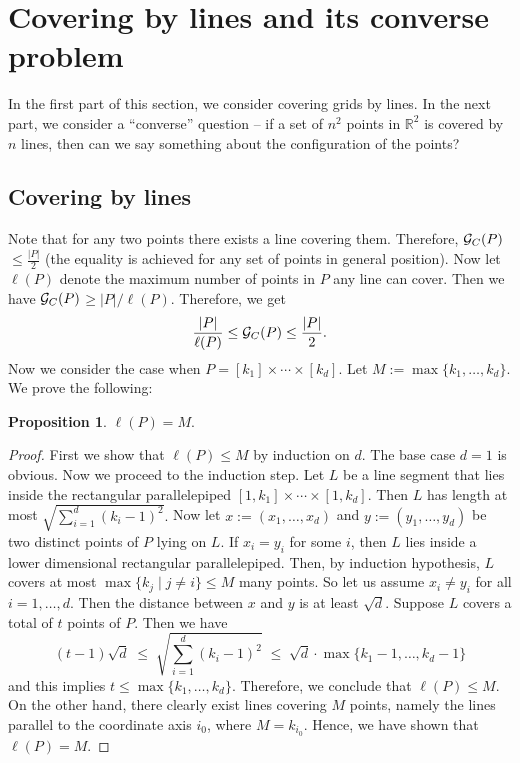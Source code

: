 \documentclass[
final
]{dmtcs-episciences}
\numberwithin{equation}{subsection}
\newtheorem{prop}[defn]{Proposition}%
\newcommand{\remove}[1]{}
\newcommand{\ga}{${\cal G}_C(P)$}
\newcommand{\size}[1]{\left| #1 \right|}
\begin{document}
\section{Covering by lines and its converse problem}\label{sec:linecover}
\noindent	
In the first part of this section, we consider covering grids by lines\remove{\footnote{We mean lines clipped by the grid.}}\remove{(the bounds can be easily obtained; we have included it for the sake of completeness)}. In the next part, we consider a ``converse'' question -- if a set of $n^2$ points in $\mathbb{R}^2$ is covered by $n$ lines, then can we say something about the configuration of the points? 
\subsection{Covering by lines}\label{ssec:linecover}
\noindent
Note that for any two points there exists a line covering them. Therefore, \ga$ \leq \frac{\size{P}}{2}$ (the equality is achieved for any set of points in general position). Now let $\ell (P)$ denote the maximum number of points in $P$ any line can cover. Then we have \ga$\geq \size{P}/\ell (P)$. Therefore, we get 
\begin{equation}
	\frac{\size{P}}{\ell (P)} \leq \mbox{\ga} \leq \frac{\size{P}}{2}.
	\label{eq:linebound}
\end{equation}
Now we consider the case when $P = [k_1]\times \cdots \times [k_d]$. Let $M:=\max \{ k_1,\ldots ,k_d\}$. We prove the following:
\begin{prop}
	$\ell (P)=M.$
	\label{prop:line}
\end{prop}
\begin{proof}
	First we show that $\ell (P)\leq M$ by induction on $d$. The base case $d=1$ is obvious. Now we proceed to the induction step. Let $L$ be a line segment that lies inside the rectangular parallelepiped $[1,k_1]\times\cdots\times [1,k_d]$. Then $L$ has length at most $\sqrt{\sum_{i=1}^d (k_i-1)^2}.$ Now let $x:=(x_1,\ldots ,x_d)$ and $y:=(y_1,\ldots ,y_d)$ be two distinct points of $P$ lying on $L$. If $x_i=y_i$ for some $i$, then $L$ lies inside a lower dimensional rectangular parallelepiped. Then, by induction hypothesis, $L$ covers at most $\max \{k_j\mid j\ne i\}\leq M$ many points. So let us assume $x_i\ne y_i$ for all $i=1,\ldots ,d$. Then the distance between $x$ and $y$ is at least $\sqrt{d}$. Suppose $L$ covers a total of $t$ points of $P$. Then we have 
	$$ (t-1)\sqrt{d}\; \leq\; \sqrt{\sum_{i=1}^d (k_i-1)^2}\; \leq\; \sqrt{d}\cdot\max\{k_1-1,\ldots ,k_d-1\}  $$
	and this implies $t\leq\max\{k_1,\ldots ,k_d\}$. Therefore, we conclude that $\ell (P)\leq M$. On the other hand, there clearly exist lines covering $M$ points, namely the lines parallel to the coordinate axis $i_0$, where $M=k_{i_0}$. Hence, we have shown that $\ell (P)=M$.
\end{proof}
\end{document}
